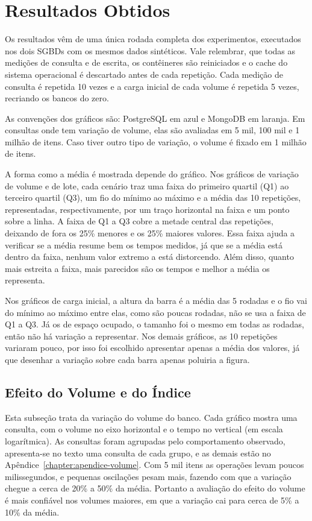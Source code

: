 \section{Resultados Obtidos}
\label{sec:resultados}

Os resultados vêm de uma única rodada completa dos experimentos, executados nos dois SGBDs com os mesmos dados sintéticos. Vale relembrar, que todas as medições de 
consulta e de escrita, os contêineres são reiniciados e o cache do sistema operacional é descartado antes de cada repetição. 
Cada medição de consulta é repetida 10 vezes e a carga inicial de cada volume é repetida 5 vezes, recriando os bancos do zero. 

As convenções dos gráficos são: PostgreSQL em azul e MongoDB em laranja. Em consultas onde tem variação de volume, elas são avaliadas em 5 mil, 100 mil e 1 milhão de itens. Caso tiver outro tipo de variação, 
o volume é fixado em 1 milhão de itens.

A forma como a média é mostrada depende do gráfico. 
Nos gráficos de variação de volume e de
lote, cada cenário traz uma faixa do primeiro quartil (Q1) ao terceiro quartil (Q3), um fio do
mínimo ao máximo e a média das 10 repetições, representadas, respectivamente, por um traço horizontal na faixa e um
ponto sobre a linha. A faixa de Q1 a Q3 cobre a metade central das repetições, deixando de fora os
25\% menores e os 25\% maiores valores. Essa faixa ajuda a verificar se a média resume bem os tempos medidos, já que
se a média está dentro da faixa, nenhum valor extremo a está distorcendo. Além
disso, quanto mais estreita a faixa, mais parecidos são os tempos e melhor a
média os representa.


Nos gráficos de carga inicial, a altura da barra é a média das
5 rodadas e o fio vai do mínimo ao máximo entre elas, como são poucas rodadas,
não se usa a faixa de Q1 a Q3. Já os de espaço ocupado, o tamanho foi o mesmo
em todas as rodadas, então não há variação a representar. Nos demais gráficos, as 10 repetições variaram pouco, por isso foi escolhido apresentar apenas a média dos valores, já que desenhar a variação sobre cada
barra apenas poluiria a figura.

\subsection{Efeito do Volume e do Índice}

Esta subseção trata da variação do volume do banco. Cada gráfico mostra uma
consulta, com o volume no eixo horizontal e o
tempo no vertical (em escala logarítmica). As consultas foram agrupadas pelo 
comportamento observado, apresenta-se no texto uma consulta de cada grupo, e as
demais estão no Apêndice~\ref{chapter:apendice-volume}. Com 5 mil itens as operações levam
poucos milissegundos, e pequenas oscilações pesam mais, fazendo com que a variação chegue a
cerca de 20\% a 50\% da média. Portanto a avaliação do efeito do volume é mais confiável nos volumes maiores, em que a variação cai para cerca de 5\% a 10\% da média. 

